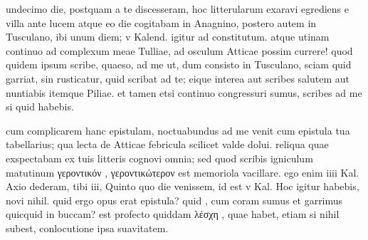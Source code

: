 


 undecimo die, postquam a te discesseram, hoc litterularum exaravi egrediens e villa ante lucem atque eo die cogitabam in Anagnino, postero autem in Tusculano, ibi unum diem; v Kalend. igitur ad constitutum. atque utinam continuo ad complexum meae Tulliae, ad osculum Atticae possim currere! quod quidem ipsum scribe, quaeso, ad me ut, dum consisto in Tusculano, sciam quid garriat, sin rusticatur, quid scribat ad te; eique interea aut scribes salutem aut nuntiabis itemque Piliae. et tamen etsi continuo congressuri sumus, scribes ad me si quid habebis.

 cum complicarem hanc epistulam, noctuabundus ad me venit cum epistula tua tabellarius; qua lecta de Atticae febricula scilicet valde dolui. reliqua quae exspectabam ex tuis litteris cognovi omnia; sed quod scribis igniculum matutinum γεροντικόν , γεροντικώτερον est memoriola vacillare. ego enim iiii Kal. Axio dederam, tibi iii, Quinto quo die venissem, id est v Kal. Hoc igitur habebis, novi nihil. quid ergo opus erat epistula? quid , cum coram sumus et garrimus quicquid in buccam? est profecto quiddam λέσχη , quae habet, etiam si nihil subest, conlocutione ipsa suavitatem.
